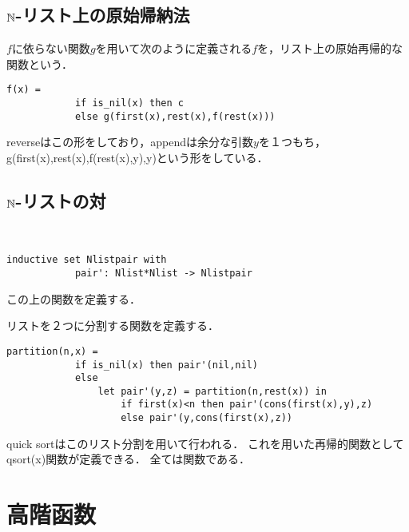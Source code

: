 \documentclass[uplatex, 12pt, dvipdfmx]{jsreport}
\begin{document}
\subsection{$\mathbb{N}$-リスト上の原始帰納法}

\begin{definition}[リスト上の原始帰納法]
    $f$に依らない関数$g$を用いて次のように定義される$f$を，リスト上の原始再帰的な関数という．
    \begin{lstlisting}[caption=append]
        f(x) =
            if is_nil(x) then c
            else g(first(x),rest(x),f(rest(x)))
    \end{lstlisting}
    reverseはこの形をしており，appendは余分な引数$y$を１つもち，g(first(x),rest(x),f(rest(x),y),y)という形をしている．
\end{definition}

\subsection{$\mathbb{N}$-リストの対}

\begin{definition}　

    \begin{lstlisting}[caption=pair of Nlist]
        inductive set Nlistpair with
            pair': Nlist*Nlist -> Nlistpair
    \end{lstlisting}
\end{definition}

この上の関数を定義する．
\begin{example}[リスト分割]
    リストを２つに分割する関数を定義する．
    \begin{lstlisting}[caption=partition]
        partition(n,x) = 
            if is_nil(x) then pair'(nil,nil)
            else
                let pair'(y,z) = partition(n,rest(x)) in
                    if first(x)<n then pair'(cons(first(x),y),z)
                    else pair'(y,cons(first(x),z))
    \end{lstlisting}
\end{example}

\begin{application}
    quick sortはこのリスト分割を用いて行われる．
    これを用いた再帰的関数としてqsort(x)関数が定義できる．
    全ては関数である．
\end{application}

\section{高階函数}
\end{document}
